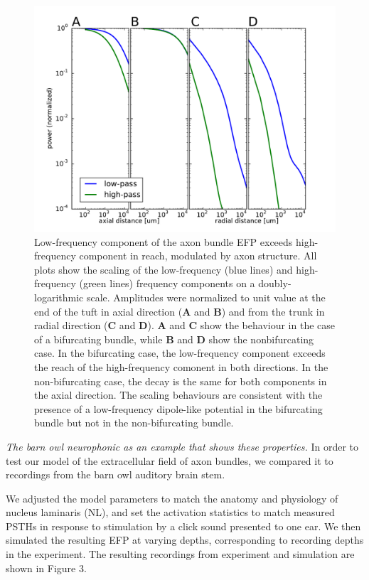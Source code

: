 \documentclass[]{article}
\begin{document}
\begin{figure}[htbp]
\centering
\includegraphics{../figs/fig_2.pdf}
\caption{Low-frequency component of the axon bundle EFP exceeds
high-frequency component in reach, modulated by axon structure. All
plots show the scaling of the low-frequency (blue lines) and
high-frequency (green lines) frequency components on a
doubly-logarithmic scale. Amplitudes were normalized to unit value at
the end of the tuft in axial direction (\textbf{A} and \textbf{B}) and
from the trunk in radial direction (\textbf{C} and \textbf{D}).
\textbf{A} and \textbf{C} show the behaviour in the case of a
bifurcating bundle, while \textbf{B} and \textbf{D} show the
nonbifurcating case. In the bifurcating case, the low-frequency
component exceeds the reach of the high-frequency comonent in both
directions. In the non-bifurcating case, the decay is the same for both
components in the axial direction. The scaling behaviours are consistent
with the presence of a low-frequency dipole-like potential in the
bifurcating bundle but not in the non-bifurcating bundle.}
\end{figure}

\emph{The barn owl neurophonic as an example that shows these
properties.} In order to test our model of the extracellular field of
axon bundles, we compared it to recordings from the barn owl auditory
brain stem.

We adjusted the model parameters to match the anatomy and physiology of
nucleus laminaris (NL), and set the activation statistics to match
measured PSTHs in response to stimulation by a click sound presented to
one ear. We then simulated the resulting EFP at varying depths,
corresponding to recording depths in the experiment. The resulting
recordings from experiment and simulation are shown in Figure 3.
\end{document}
